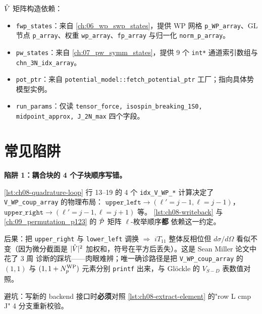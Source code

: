 \(\hat{V}\) 矩阵构造依赖：
\begin{itemize}
  \item \texttt{fwp\_states}：来自 \cref{ch:06_wp_swp_states}，提供 WP 网格
        \texttt{p\_WP\_array}、GL 节点 \texttt{p\_array}、权重
        \texttt{wp\_array}、\texttt{fp\_array} 与归一化 \texttt{norm\_p\_array}。
  \item \texttt{pw\_states}：来自 \cref{ch:07_pw_symm_states}，提供 9 个
        \texttt{int*} 通道索引数组与
        \texttt{chn\_3N\_idx\_array}。
  \item \texttt{pot\_ptr}：来自 \texttt{potential\_model::fetch\_potential\_ptr}
        工厂；指向具体势模型实例。
  \item \texttt{run\_params}：仅读 \texttt{tensor\_force, isospin\_breaking\_1S0,
        midpoint\_approx, J\_2N\_max} 四个字段。
\end{itemize}

\section{常见陷阱}
\label{sec:ch08-pitfalls}

\begin{pitfallbox}[label={box:ch08-pitfall-coupled-order}]
\textbf{陷阱 1：耦合块的 4 个子块顺序写错。}

\cref{lst:ch08-quadrature-loop} 行 13--19 的 4 个 \texttt{idx\_V\_WP\_*}
计算决定了 \texttt{V\_WP\_coup\_array} 的物理布局：
\(\texttt{upper\_left} \to (\ell' = j-1, \ell = j-1)\)，
\(\texttt{upper\_right} \to (\ell' = j-1, \ell = j+1)\) 等。
\cref{lst:ch08-writeback} 与
\cref{ch:09_permutation_p123} 的 \(\hat{\mathcal{P}}\) 矩阵 \(\ell\)-枚举顺序\textbf{都}
依赖这一约定。

后果：把 \texttt{upper\_right} 与 \texttt{lower\_left} 调换 \(\Rightarrow\)
\(iT_{11}\) 整体反相位但 \(d\sigma/d\Omega\) 看似不变（因为微分截面是
\(|\hat{V}|^2\) 加权和，符号在平方后丢失）。这是 Sean Miller 论文中花了 3 周
诊断的踩坑——肉眼难辨；唯一确诊路径是把 \texttt{V\_WP\_coup\_array} 的
\((1, 1)\) 与 \((1, 1+{N_{p}^{\text{WP}}})\) 元素分别 \texttt{printf} 出来，与 Glöckle 的
\(V_{S\!-\!D}\) 表数值对照。

避坑：写新的 backend 接口时\textbf{必须}对照
\cref{lst:ch08-extract-element} 的"row L cmp J" 4 分支重新校验。
\end{pitfallbox}

